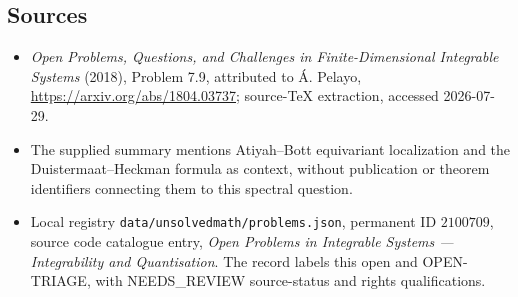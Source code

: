 \documentclass[11pt]{article}
\begin{document}
\subsection{Sources}
\begin{itemize}
\item \emph{Open Problems, Questions, and Challenges in Finite-Dimensional Integrable Systems} (2018), Problem 7.9, attributed to Á. Pelayo, \url{https://arxiv.org/abs/1804.03737}; source-TeX extraction, accessed 2026-07-29.
\item The supplied summary mentions Atiyah--Bott equivariant localization and the Duistermaat--Heckman formula as context, without publication or theorem identifiers connecting them to this spectral question.
\item Local registry \texttt{data/unsolvedmath/problems.json}, permanent ID $2100709$, source code catalogue entry, \emph{Open Problems in Integrable Systems --- Integrability and Quantisation}. The record labels this open and OPEN-TRIAGE, with NEEDS\_REVIEW source-status and rights qualifications.
\end{itemize}
\end{document}
